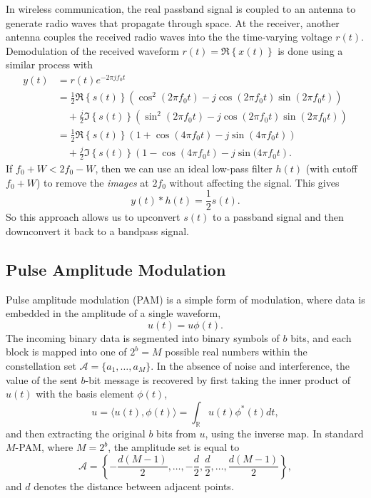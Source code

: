 In wireless communication, the real passband signal is coupled to an antenna to generate radio waves that propagate through space.
At the receiver, another antenna couples the received radio waves into the the time-varying voltage $r(t)$.
Demodulation of the received waveform $r(t) = \Re \left\{ x(t) \right \}$ is done using a similar process with
\begin{align*}
y(t)
& = r(t) e^{-2\pi j f_0 t} \\
& =  \frac{1}{2} \Re \left\{ s(t) \right\} \left( \cos^2 (2 \pi f_0 t) - j \cos(2\pi f_0 t) \sin(2\pi f_0 t) \right) \\
& \quad + \frac{j}{2} \Im \left\{ s(t) \right\} \left( \sin^2 (2 \pi f_0 t) - j \cos(2\pi f_0 t) \sin(2\pi f_0 t) \right) \\
& =  \frac{1}{2} \Re \left\{ s(t) \right\} \left( 1 + \cos(4\pi f_0 t) - j \sin(4\pi f_0 t) \right) \\
& \quad + \frac{j}{2} \Im \left\{ s(t) \right\} \left( 1 - \cos(4 \pi f_0 t) - j \sin(4 \pi f_0 t \right).
\end{align*}
If $f_0 + W < 2 f_0 - W$, then we can use an ideal low-pass filter $h(t)$ (with cutoff $f_0+W$) to remove the \emph{images} at $2f_0$ without affecting the signal.
This gives
\[ y(t) * h(t) = \frac{1}{2} s(t). \]
So this approach allows us to upconvert $s(t)$ to a passband signal and then downconvert it back to a bandpass signal.

\iffalse
\subsection{Pulse Amplitude Modulation}

Pulse amplitude modulation (PAM) is a simple form of modulation, where data is embedded in the amplitude of a single waveform,
\begin{equation*}
u(t) = u \phi (t) .
\end{equation*}
The incoming binary data is segmented into binary symbols of $b$ bits, and each block is mapped into one of $2^b = M$ possible real numbers within the constellation set $\mathcal{A} = \{ a_1, \ldots, a_M \}$.
In the absence of noise and interference, the value of the sent $b$-bit message is recovered by first taking the inner product of $u(t)$ with the basis element $\phi (t)$,
\begin{equation*}
u = \langle u(t), \phi(t) \rangle = \int_{\mathbb{R}} u(t) \phi^*(t) dt ,
\end{equation*}
and then extracting the original $b$ bits from $u$, using the inverse map.
In standard $M$-PAM, where $M = 2^b$, the amplitude set is equal to
\begin{equation*}
\mathcal{A} = \left\{ - \frac{d(M-1)}{2} , \ldots, - \frac{d}{2}, \frac{d}{2}, \ldots, \frac{d(M-1)}{2} \right\} ,
\end{equation*}
and $d$ denotes the distance between adjacent points.

